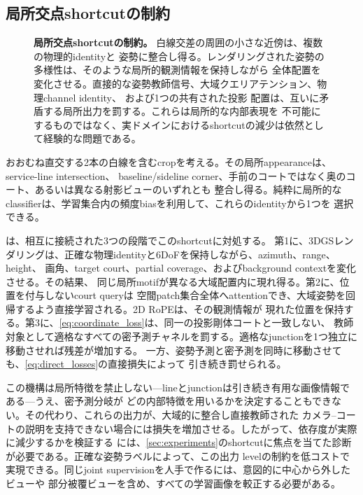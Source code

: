 \subsection{局所交点shortcutの制約}
\label{sec:shortcut}

\begin{figure}[t]
  \centering
  \resizebox{\linewidth}{!}{}
  \caption{\textbf{局所交点shortcutの制約。}  白線交差の周囲の小さな近傍は、複数の物理的identityと
  姿勢に整合し得る。レンダリングされた姿勢の多様性は、そのような局所的観測情報を保持しながら
  全体配置を変化させる。直接的な姿勢教師信号、大域クエリアテンション、物理channel identity、
  および1つの共有された投影 \KP 配置は、互いに矛盾する局所出力を罰する。これらは局所的な内部表現を
  不可能にするものではなく、実ドメインにおけるshortcutの減少は依然として経験的な問題である。}
  \label{fig:shortcut}
\end{figure}

おおむね直交する2本の白線を含むcropを考える。その局所appearanceは、service-line intersection、
baseline/sideline corner、手前のコートではなく奥のコート、あるいは異なる射影ビューのいずれとも
整合し得る。純粋に局所的なclassifierは、学習集合内の頻度biasを利用して、これらのidentityから1つを
選択できる。

\Method{}は、相互に接続された3つの段階でこのshortcutに対処する。
第1に、3DGSレンダリングは、正確な物理identityと6DoFを保持しながら、azimuth、range、height、
画角、target court、partial coverage、およびbackground contextを変化させる。その結果、
同じ局所motifが異なる大域配置内に現れ得る。第2に、位置を付与しないcourt queryは
空間patch集合全体へattentionでき、大域姿勢を回帰するよう直接学習される。2D RoPEは、その観測情報が
現れた位置を保持する。第3に、\cref{eq:coordinate_loss}は、同一の投影剛体コートと一致しない、
教師対象として適格なすべての密予測チャネルを罰する。適格なjunctionを1つ独立に移動させれば残差が増加する。
一方、姿勢予測と密予測を同時に移動させても、\cref{eq:direct_losses}の直接損失によって
引き続き罰せられる。

この機構は局所特徴を禁止しない---lineとjunctionは引き続き有用な画像情報である---うえ、密予測分岐が
どの内部特徴を用いるかを決定することもできない。その代わり、これらの出力が、大域的に整合し直接教師された
カメラ--コートの説明を支持できない場合には損失を増加させる。したがって、依存度が実際に減少するかを検証する
には、\cref{sec:experiments}のshortcutに焦点を当てた診断が必要である。正確な姿勢ラベルによって、この出力
levelの制約を低コストで実現できる。同じjoint supervisionを人手で作るには、意図的に中心から外したビューや
部分被覆ビューを含め、すべての学習画像を較正する必要がある。
